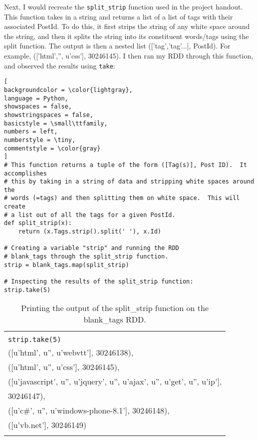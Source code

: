 \documentclass[]{article}
\newcommand{\code}[1]{\colorbox{light-gray}{\texttt{#1}}}
\begin{document}
Next, I would recreate the \code{split\_strip} function used in the project handout.  This function takes in a string and returns a list of a list of tags with their associated PostId.  To do this, it first strips the string of any white space around the string, and then it splits the string into its constituent words/tags using the split function.  The output is then a nested list (['tag','tag'...], PostId).  For example, 
(['html','', u'css'], 30246145).  I then ran my RDD through this function, and observed the results using \code{take}:
\begin{lstlisting}[
backgroundcolor = \color{lightgray},
language = Python,
showspaces = false,
showstringspaces = false,
basicstyle = \small\ttfamily,
numbers = left,
numberstyle = \tiny,
commentstyle = \color{gray}
]
# This function returns a tuple of the form ([Tag(s)], Post ID).  It accomplishes 
# this by taking in a string of data and stripping white spaces around the 
# words (=tags) and then splitting them on white space.  This will create
# a list out of all the tags for a given PostId.  
def split_strip(x):
	return (x.Tags.strip().split(' '), x.Id)

# Creating a variable "strip" and running the RDD 
# blank_tags through the split_strip function. 
strip = blank_tags.map(split_strip)

# Inspecting the results of the split_strip function:
strip.take(5)
\end{lstlisting}
\pagebreak
\begin{table}[!ht]
	\begin{center}
		\caption{Printing the output of the split\_strip function on the blank\_tags RDD.}
		\label{tab:table1}
		\begin{tabular}{|l|} 
			\hline
			\\
			\code{strip.take(5)}\\
			\hline
			([u'html', u'', u'webvtt'], 30246138),\\
			([u'html', u'', u'css'], 30246145),\\
			([u'javascript', u'', u'jquery', u'', u'ajax', u'', u'get', u'', u'ip'],\\
			30246147),\\
			([u'c\#', u'', u'windows-phone-8.1'], 30246148),\\
			([u'vb.net'], 30246149)\\
			\\
			\hline
		\end{tabular}
	\end{center}
\end{table}
\end{document}
